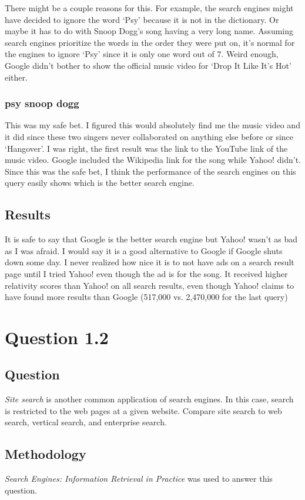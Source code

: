 \documentclass[10pt,letterpaper,bibliography=totocnumbered]{scrartcl}
\begin{document}
There might be a couple reasons for this. For example, the search engines might have decided to ignore the word `Psy' because it is not in the dictionary. Or maybe it has to do with Snoop Dogg's song having a very long name. Assuming search engines prioritize the words in the order they were put on, it's normal for the engines to ignore `Psy' since it is only one word out of 7. Weird enough, Google didn't bother to show the official music video for `Drop It Like It's Hot' either.

\subsubsection{psy snoop dogg}
This was my safe bet. I figured this would absolutely find me the music video and it did since these two singers never collaborated on anything else before or since `Hangover'. I was right, the first result was the link to the YouTube link of the music video. Google included the Wikipedia link for the song while Yahoo! didn't. Since this was the safe bet, I think the performance of the search engines on this query easily shows which is the better search engine.

\subsection{Results}
It is safe to say that Google is the better search engine but Yahoo! wasn't as bad as I was afraid. I would say it is a good alternative to Google if Google shuts down some day. I never realized how nice it is to not have ads on a search result page until I tried Yahoo! even though the ad is for the song. It received higher relativity scores than Yahoo! on all search results, even though Yahoo! claims to have found more results than Google (517,000 vs. 2,470,000 for the last query)


\section{Question 1.2}
\subsection{Question}
\textit{Site search} is another common application of search engines. In this case, search is restricted to the web pages at a given website. Compare site search to web search, vertical search, and enterprise search.

\subsection{Methodology}
\textit{Search Engines: Information Retrieval in Practice} \cite{classtext} was used to answer this question.
\end{document}
